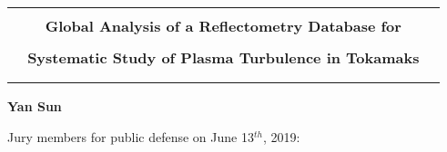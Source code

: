\begin{titlepage}
\begin{center}
\begin{tabular}{c}
\noalign{\smallskip} \hline \hline \noalign{\smallskip}\\
{\Large \bf {{\Large~~~} Global Analysis of a Reflectometry Database for {\Large~~~}}}\\ \\
{\Large \bf {Systematic Study of Plasma Turbulence in Tokamaks }}\\ \\





\noalign{\smallskip} \hline \hline \noalign{\smallskip}
\end{tabular}


\vspace{0.4cm}
{\Large
\textbf{Yan Sun}}\\

\vspace{0.4cm}

{\normalsize Jury members for public defense on June 13$^{th}$, 2019:} \\
\vspace{.4cm}
\begin{tabular}{lcl}
\hline



\end{tabular}
\end{center}
\end{titlepage}
